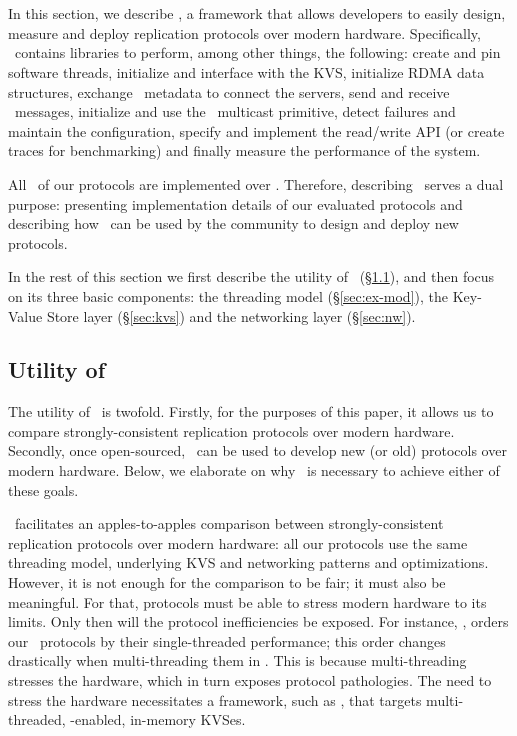 \section{\odlib}
\label{sec:od}


In this section, we 
describe \odlib, a framework that allows developers to easily design, measure and deploy replication protocols over modern hardware.
Specifically, \odlib~contains libraries to perform, among other things, the following:
create and pin software threads, initialize and interface with the KVS, initialize RDMA data structures, exchange \RDMA~metadata to connect the servers, send and receive \RDMA~messages, initialize and use the \RDMA~multicast primitive, detect failures and maintain the configuration, specify and implement the read/write API (or create traces for benchmarking) and finally measure the performance of the system. %

All \pnum~of our protocols are implemented over \odlib.
Therefore, describing \odlib~serves a dual purpose: presenting implementation details of our evaluated protocols and describing how \odlib~can be used by the community to design and deploy new protocols.

In the rest of this section we first describe the utility of \odlib\ (\S\ref{sec:why}), and then focus on its three basic components: the threading model (\S\ref{sec:ex-mod}), the Key-Value Store layer (\S\ref{sec:kvs}) and the networking layer (\S\ref{sec:nw}).

\subsection{Utility of \odlib}\label{sec:why}

The utility of \odlib~is twofold. Firstly, for the purposes of this paper, it allows us to compare strongly-consistent replication protocols over modern hardware.
Secondly, once open-sourced, \odlib\ can be used to develop new (or old) protocols over modern hardware.
Below, we elaborate on why \odlib\ is necessary to achieve either of these goals.


\odlib\ facilitates an apples-to-ap\-ples comparison between strongly-consistent replication protocols over modern hardware:
all our protocols use the same threading model, underlying KVS and networking patterns and optimizations.
However, it is not enough for the comparison to be fair; it must also be meaningful. For that, protocols must be able to stress modern hardware to its limits. Only then will the protocol inefficiencies be exposed.
For instance, , orders our \pnum\ protocols by their single-threaded performance;
this order changes drastically when multi-threading them in . 
This is because multi-threading stresses the hardware, which in turn exposes protocol pathologies. %
The need to stress the hardware necessitates a framework, such as \odlib, that targets multi-threaded, \RDMA-enabled, in-memory KVSes.


